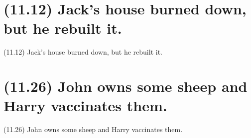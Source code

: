 \documentclass{article}
\begin{document}
\clearpage

%
%

\section*{(11.12) Jack's house burned down, but he rebuilt it.}

\bigbreak
\begin{enumerate*}
\item[(11.12)] Jack's house burned down, but he rebuilt it.
\end{enumerate*}
\bigbreak

\bigbreak
\begin{minipage}{\textwidth}
\end{minipage}
\bigbreak

\clearpage

%
%

\section*{(11.26) John owns some sheep and Harry vaccinates them.}

\bigbreak
\begin{enumerate*}
\item[(11.26)] John owns some sheep and Harry vaccinates them.
\end{enumerate*}
\bigbreak
\end{document}
